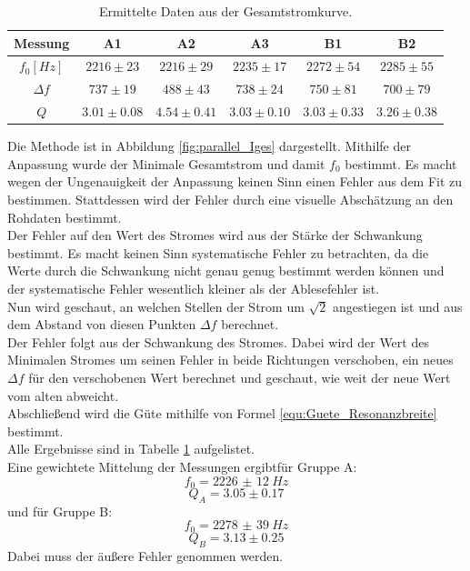 \documentclass[12pt,a4paper]{article}
\begin{document}
\begin{table}
\centering
\begin{tabular}{|c|c|c|c||c|c|}
\hline
Messung & A1 & A2 & A3 & B1 & B2\\
\hline
$f_0[Hz]$ & $2216\pm 23 $ & $2216\pm 29 $ & $2235\pm 17$ & $2272\pm 54$ & $2285\pm 55$\\
\hline
$\Delta f$ & $737\pm 19 $ & $488\pm 43 $ & $738\pm 24$ & $750\pm 81$ & $700\pm 79$\\
\hline
$Q$ & $3.01\pm 0.08 $ & $4.54\pm 0.41 $ & $3.03\pm 0.10$ & $3.03\pm 0.33$ & $3.26\pm 0.38$\\
\hline
\end{tabular}
\label{tab:parallel_methode1}
\caption{Ermittelte Daten aus der Gesamtstromkurve.}
\end{table}

Die Methode ist in Abbildung \ref{fig:parallel_Iges} dargestellt.
Mithilfe der Anpassung wurde der Minimale Gesamtstrom und damit $f_0$ bestimmt. Es macht wegen der Ungenauigkeit der Anpassung keinen Sinn einen Fehler aus dem Fit zu bestimmen.  Stattdessen wird der Fehler durch eine visuelle Abschätzung an den Rohdaten bestimmt.\\
Der Fehler auf den Wert des Stromes wird aus der Stärke der Schwankung bestimmt. Es macht keinen Sinn systematische Fehler zu betrachten, da die Werte durch die Schwankung nicht genau genug bestimmt werden können und der systematische Fehler wesentlich kleiner als der Ablesefehler ist.\\
Nun wird geschaut, an welchen Stellen der Strom um $\sqrt{2}$ angestiegen ist und aus dem Abstand von diesen Punkten $\Delta f$ berechnet.\\
Der Fehler folgt aus der Schwankung des Stromes. Dabei wird der Wert des Minimalen Stromes um seinen Fehler in beide Richtungen verschoben, ein neues $\Delta f$ für den verschobenen Wert berechnet und geschaut, wie weit der neue Wert vom alten abweicht.\\
Abschließend wird die Güte mithilfe von Formel \ref{equ:Guete_Resonanzbreite} bestimmt.\\
Alle Ergebnisse sind in Tabelle \ref{tab:parallel_methode1} aufgelistet.\\
Eine gewichtete Mittelung der Messungen ergibtfür Gruppe A:
\begin{equation}
f_0 = \SI{2226(12)}{Hz}
\end{equation}
\begin{equation}
Q_A = 3.05\pm 0.17 
\end{equation}
und für Gruppe B:
\begin{equation}
f_0 = \SI{2278(39)}{Hz}
\end{equation}
\begin{equation}
Q_B = 3.13\pm 0.25 
\end{equation}
Dabei muss der äußere Fehler genommen werden.
\end{document}
